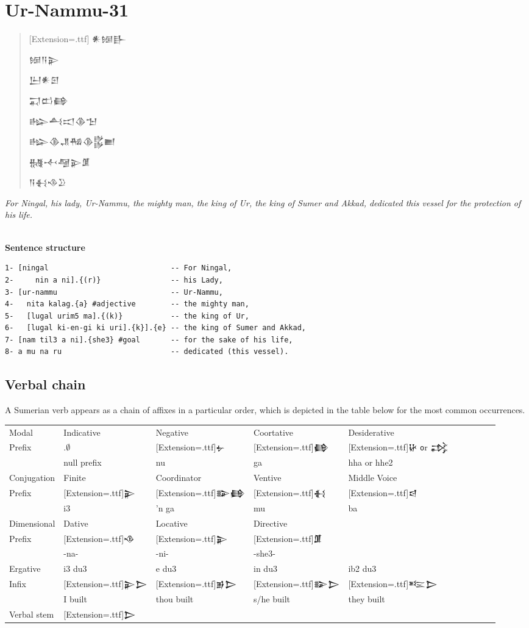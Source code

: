 \documentclass[a4paper,12pt]{book}
\newcommand{\fsm}{\Large\setmainfont{Akkadian}[Extension=.ttf]}
\begin{document}
\chapter{Ur-Nammu-31}
\begin{quotation}\fsm
𒀭𒎏𒃲
  
𒎏𒀀𒉌

𒌨𒀭𒇉

𒍑𒆗𒂵

𒈗𒋀𒀊𒆠𒈠

𒈗𒆠𒂗𒄀𒆠𒌵𒆤

𒉆𒋾𒆷𒉌𒂠

𒀀𒈬𒈾𒊒
\end{quotation}
{\em For Ningal, his lady, Ur-Nammu,
  the mighty man, the king of Ur,
  the king of Sumer and Akkad,
  dedicated this vessel for the protection of his life.}

\verb||\\
{\large\bf Sentence structure}
\begin{verbatim}
1- [ningal                            -- For Ningal,
2-     nin a ni].{(r)}                -- his Lady,
3- [ur-nammu                          -- Ur-Nammu,
4-   nita kalag.{a} #adjective        -- the mighty man,
5-   [lugal urim5 ma].{(k)}           -- the king of Ur,
6-   [lugal ki-en-gi ki uri].{k}].{e} -- the king of Sumer and Akkad,
7- [nam til3 a ni].{she3} #goal       -- for the sake of his life,
8- a mu na ru                         -- dedicated (this vessel).
\end{verbatim}

\newpage
\section{Verbal chain}
A Sumerian verb appears
as a chain of affixes in a particular order,
which is depicted in the table below for
the most common occurrences.\\

\noindent
\begin{tabular}[!h]{|l | l | l | l | l | l l l l l}
  \hline
  Modal  & Indicative & Negative
  & Coortative & Desiderative\\
  Prefix&$.\emptyset$ &\fsm 𒉡 &\fsm 𒂵 &\fsm 𒄩
       {\texttt or} 𒃶\\
  & null prefix & nu & ga & hha or hhe2\\
  \hline
  Conjugation  & Finite & Coordinator & Ventive & Middle Voice\\
  Prefix&\fsm 𒉌 &\fsm 𒅔𒂵 &\fsm 𒈬 &\fsm 𒁀\\
  & i3 & 'n ga & mu & ba\\
  \hline
  Dimensional & Dative &Locative &Directive &\\
  Prefix &\fsm 𒈾&\fsm 𒉌 &\fsm 𒂠 & \\
  & -na- & -ni- & -she3- &\\
  \hline
  Ergative & i3 du3 & e du3 & in du3 & ib2 du3 \\
  Infix   &\fsm 𒉌𒆕&\fsm 𒂊𒆕 &\fsm 𒅔𒆕 &\fsm 𒌈𒆕\\
  &I built & thou built & s/he built & they built\\
  \hline
  Verbal stem &\multicolumn{4}{l|}{\fsm 𒆕}\\
  \hline
\end{tabular}
\end{document}
